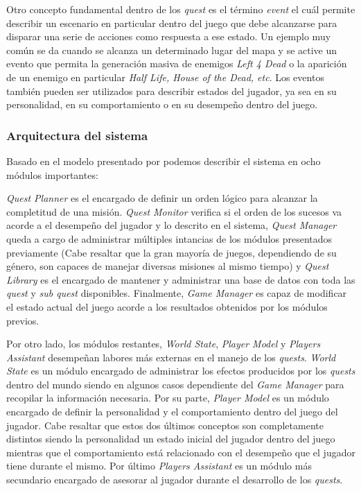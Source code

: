 \documentclass[conference]{IEEEtran}
\begin{document}
Otro concepto fundamental dentro de los \textit{quest} es el término \textit{event} el cuál permite describir un escenario en particular dentro del juego que debe alcanzarse para disparar una serie de acciones  como respuesta a ese estado. Un ejemplo muy común se da cuando se alcanza un determinado lugar del mapa y se active un evento que permita la generación masiva de enemigos \textit{Left 4 Dead} o la aparición de un enemigo en particular \textit{Half Life, House of the Dead, etc}. Los eventos también pueden ser utilizados para describir estados del jugador, ya sea en su personalidad, en su comportamiento o en su desempeño dentro del juego.

\subsubsection{Arquitectura del sistema}

Basado en el modelo presentado por \citep{de2018player} podemos describir el sistema en ocho módulos importantes:

\textit{Quest Planner} es el encargado de definir un orden lógico para alcanzar la completitud de una misión. \textit{Quest Monitor} verifica si el orden de los sucesos va acorde a el desempeño del jugador y lo descrito en el sistema, \textit{Quest Manager} queda a cargo de administrar múltiples intancias de los módulos presentados previamente (Cabe resaltar que la gran mayoría de juegos, dependiendo de su género, son capaces de manejar diversas misiones al mismo tiempo) y \textit{Quest Library} es el encargado de mantener y administrar una base de datos con toda las \textit{quest} y  \textit{sub quest} disponibles. Finalmente, \textit{Game Manager} es capaz de modificar el estado actual del juego acorde a los resultados obtenidos por los módulos previos.

Por otro lado, los módulos restantes, \textit{World State}, \textit{Player Model} y \textit{Players Assistant} desempeñan labores más externas en el manejo de los \textit{quests}. \textit{World State} es un módulo encargado de administrar los efectos producidos por los \textit{quests} dentro del mundo siendo en algunos casos dependiente del  \textit{Game Manager} para recopilar la información necesaria. Por su parte, \textit{Player Model} es un módulo encargado de definir la personalidad y el comportamiento dentro del juego del jugador. Cabe resaltar que estos dos últimos conceptos son completamente distintos siendo la personalidad un estado inicial del jugador dentro del juego mientras que el comportamiento está relacionado con el desempeño que el jugador tiene durante el mismo. Por último \textit{Players Assistant} es un módulo más secundario encargado de asesorar al jugador durante el desarrollo de los \textit{quests}.
\end{document}
